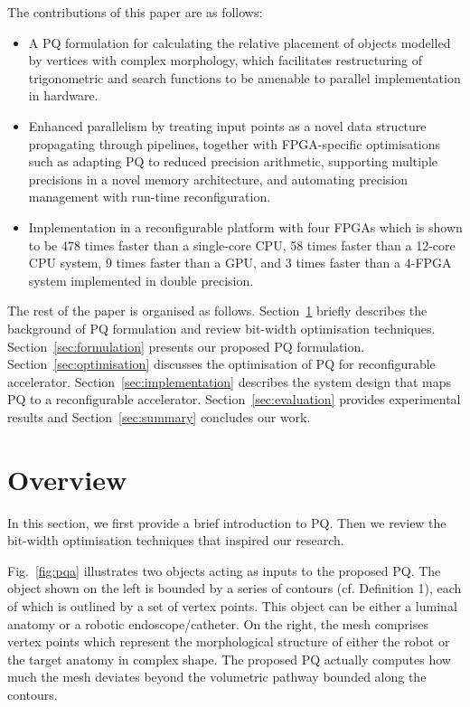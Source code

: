 The contributions of this paper are as follows:
\begin{itemize}
\item A PQ formulation for calculating the relative placement of objects modelled by vertices with complex morphology, which facilitates
restructuring of trigonometric and search functions to be amenable to parallel implementation in hardware.
\item Enhanced parallelism by treating input points as a novel data structure propagating through pipelines, 
together with FPGA-specific optimisations such as adapting PQ to reduced precision arithmetic,
supporting multiple precisions in a novel memory architecture, and automating precision management with run-time reconfiguration.
\item Implementation in a reconfigurable platform with four FPGAs which is shown to be 478 times faster than a single-core CPU, 58 times faster than a 12-core CPU system, 9 times faster than a GPU, and 3 times faster than a 4-FPGA system implemented in double precision.
\end{itemize}

The rest of the paper is organised as follows.
Section~\ref{sec:overview} briefly describes the background of PQ formulation and review bit-width optimisation techniques.
Section~\ref{sec:formulation} presents our proposed PQ formulation.
Section~\ref{sec:optimisation} discusses the optimisation of PQ for reconfigurable accelerator.
Section~\ref{sec:implementation} describes the system design that maps PQ to a reconfigurable accelerator.
Section~\ref{sec:evaluation} provides experimental results and
Section~\ref{sec:summary} concludes our work.

\section{Overview}
\label{sec:overview}

In this section, we first provide a brief introduction to PQ.
Then we review the bit-width optimisation techniques that inspired our research.

Fig.~\ref{fig:pqa} illustrates two objects acting as inputs to the proposed PQ. 
The object shown on the left is bounded by a series of contours (cf. Definition 1), each of which is outlined by a set of vertex points. 
This object can be either a luminal anatomy or a robotic endoscope/catheter. 
On the right, the mesh comprises vertex points which represent the morphological structure of either the robot or the target anatomy in complex shape. 
The proposed PQ actually computes how much the mesh deviates beyond the volumetric pathway bounded along the contours.

